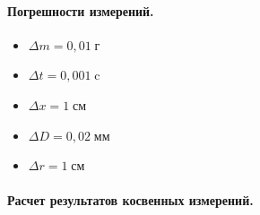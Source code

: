 \documentclass{article}
\begin{document}
\paragraph{Погрешности измерений.}
\begin{itemize}
	\item $\Delta m = 0,01\;\mbox{г}$
	\item $\Delta t = 0,001\;\mbox{c}$
	\item $\Delta x = 1\;\mbox{см}$
	\item $\Delta D = 0,02\;\mbox{мм}$
	\item $\Delta r = 1\;\mbox{см}$
\end{itemize}

\paragraph{Расчет результатов косвенных измерений.}
\end{document}
